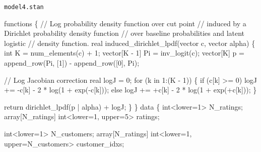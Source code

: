 \documentclass[
  letterpaper,
  DIV=11,
  numbers=noendperiod]{scrartcl}
\newenvironment{Shaded}{\begin{snugshade}}{\end{snugshade}}
\newcommand{\CommentTok}[1]{\textcolor[rgb]{0.37,0.37,0.37}{#1}}
\newcommand{\ControlFlowTok}[1]{\textcolor[rgb]{0.00,0.23,0.31}{#1}}
\newcommand{\DataTypeTok}[1]{\textcolor[rgb]{0.68,0.00,0.00}{#1}}
\newcommand{\DecValTok}[1]{\textcolor[rgb]{0.68,0.00,0.00}{#1}}
\newcommand{\KeywordTok}[1]{\textcolor[rgb]{0.00,0.23,0.31}{#1}}
\newcommand{\NormalTok}[1]{\textcolor[rgb]{0.00,0.23,0.31}{#1}}
\begin{document}
\begin{codelisting}

\caption{\texttt{model4.stan}}

\begin{Shaded}
\begin{Highlighting}[]
\KeywordTok{functions}\NormalTok{ \{}
  \CommentTok{// Log probability density function over cut point}
  \CommentTok{// induced by a Dirichlet probability density function}
  \CommentTok{// over baseline probabilities and latent logistic}
  \CommentTok{// density function.}
  \DataTypeTok{real}\NormalTok{ induced\_dirichlet\_lpdf(}\DataTypeTok{vector}\NormalTok{ c, }\DataTypeTok{vector}\NormalTok{ alpha) \{}
    \DataTypeTok{int}\NormalTok{ K = num\_elements(c) + }\DecValTok{1}\NormalTok{;}
    \DataTypeTok{vector}\NormalTok{[K {-} }\DecValTok{1}\NormalTok{] Pi = inv\_logit(c);}
    \DataTypeTok{vector}\NormalTok{[K] p = append\_row(Pi, [}\DecValTok{1}\NormalTok{]\textquotesingle{}) {-} append\_row([}\DecValTok{0}\NormalTok{]\textquotesingle{}, Pi);}

    \CommentTok{// Log Jacobian correction}
    \DataTypeTok{real}\NormalTok{ logJ = }\DecValTok{0}\NormalTok{;}
    \ControlFlowTok{for}\NormalTok{ (k }\ControlFlowTok{in} \DecValTok{1}\NormalTok{:(K {-} }\DecValTok{1}\NormalTok{)) \{}
      \ControlFlowTok{if}\NormalTok{ (c[k] \textgreater{}= }\DecValTok{0}\NormalTok{)}
\NormalTok{        logJ += {-}c[k] {-} }\DecValTok{2}\NormalTok{ * log(}\DecValTok{1}\NormalTok{ + exp({-}c[k]));}
      \ControlFlowTok{else}
\NormalTok{        logJ += +c[k] {-} }\DecValTok{2}\NormalTok{ * log(}\DecValTok{1}\NormalTok{ + exp(+c[k]));}
\NormalTok{    \}}

    \ControlFlowTok{return}\NormalTok{ dirichlet\_lpdf(p | alpha) + logJ;}
\NormalTok{  \}}
\NormalTok{\}}
\KeywordTok{data}\NormalTok{ \{}
  \DataTypeTok{int}\NormalTok{\textless{}}\KeywordTok{lower}\NormalTok{=}\DecValTok{1}\NormalTok{\textgreater{} N\_ratings;}
  \DataTypeTok{array}\NormalTok{[N\_ratings] }\DataTypeTok{int}\NormalTok{\textless{}}\KeywordTok{lower}\NormalTok{=}\DecValTok{1}\NormalTok{, }\KeywordTok{upper}\NormalTok{=}\DecValTok{5}\NormalTok{\textgreater{} ratings;}

  \DataTypeTok{int}\NormalTok{\textless{}}\KeywordTok{lower}\NormalTok{=}\DecValTok{1}\NormalTok{\textgreater{} N\_customers;}
  \DataTypeTok{array}\NormalTok{[N\_ratings] }\DataTypeTok{int}\NormalTok{\textless{}}\KeywordTok{lower}\NormalTok{=}\DecValTok{1}\NormalTok{, }\KeywordTok{upper}\NormalTok{=N\_customers\textgreater{} customer\_idxs;}


\end{Highlighting}
\end{Shaded}
\end{codelisting}
\end{document}
